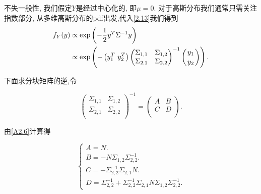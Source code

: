         \begin{pf}
            不失一般性, 我们假定$Y$是经过中心化的, 即$\mu=0$. 对于高斯分布我们通常只需关注指数部分, 从多维高斯分布的pdf出发,代入\ref{2.13}我们得到
            \begin{align}\label{A2.7}
                f_{Y}(y)&\propto\mathrm{exp}\left(-\frac{1}{2}y^{T}\Sigma^{-1}y\right) \notag \\
                &\propto\mathrm{exp}\left( -\left(y^{T}_{1}\ y^{T}_{2}\right)
                \begin{pmatrix}
                    \Sigma_{1,1} & \Sigma_{1,2} \\
                    \Sigma_{2,1} & \Sigma_{2,2} \\
                \end{pmatrix}^{-1}
                \left({y_{1}\atop y_{2}}\right)\right).
            \end{align}

            下面求分块矩阵的逆,令

            \begin{equation}
                \begin{pmatrix}
                    \Sigma_{1,1} & \Sigma_{1,2} \\
                    \Sigma_{2,1} & \Sigma_{2,2} \\
                \end{pmatrix}^{-1}=
                \begin{pmatrix}
                    A & B \\
                    C & D \\
                \end{pmatrix}.
            \end{equation}

            由\ref{A2.6}计算得

            \begin{equation}\label{A2.9}
                \begin{cases}
                    A=N. \\
                    B=-N\Sigma_{1,2}\Sigma_{2,2}^{-1}. \\ 
                    C=-\Sigma_{2,2}^{-1}\Sigma_{2,1}N. \\
                    D=\Sigma_{2,2}^{-1}+\Sigma_{2,2}^{-1}\Sigma_{2,1}N\Sigma_{1,2}\Sigma_{2,2}^{-1}. 
                \end{cases} 
            \end{equation}


\end{pf}
